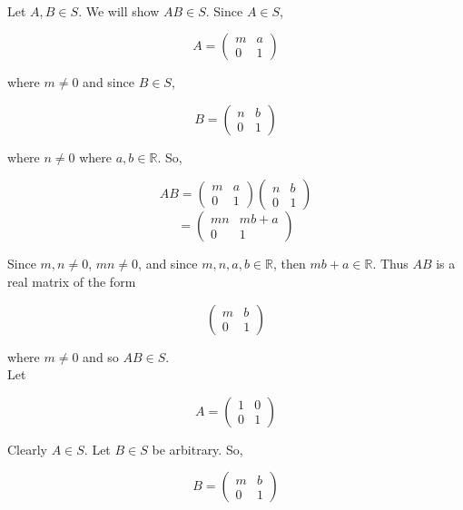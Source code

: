 \begin{solution}\renewcommand{\qedsymbol}{}\ \\
    Let $A, B\in S$. We will show $AB\in S$. Since $A\in S$,
    
    $$A=\left ( \begin{array}{cc} m & a\\ 0 & 1 \end{array} \right )$$
    
    where $m\neq0$ and since $B\in S$,
    
    $$B=\left ( \begin{array}{cc} n & b\\ 0 & 1 \end{array} \right )$$
    
    where $n\neq0$ where $a, b\in\mathbb{R}$. So,
    
    $$AB=\left(\begin{array}{cc} m & a\\ 0 & 1 \end{array}\right)
    \left(\begin{array}{cc} n & b\\ 0 & 1 \end{array}\right)$$
    $$=\left(\begin{array}{cc} mn & mb+a\\ 0 & 1 \end{array}\right)$$
    
    Since $m,n\neq0$, $mn\neq0$, and since $m,n,a,b\in\mathbb{R}$, then $mb+a\in\mathbb{R}$. Thus $AB$
    is a real matrix of the form
    
    $$\left ( \begin{array}{cc} m & b\\ 0 & 1 \end{array} \right )$$
    
    where $m\neq0$ and so $AB\in S$.\\

    Let
    
    $$A=\left ( \begin{array}{cc} 1 & 0\\ 0 & 1 \end{array} \right )$$
    
    Clearly $A\in S$. Let $B\in S$ be arbitrary. So,
    
    $$B=\left ( \begin{array}{cc} m & b\\ 0 & 1 \end{array} \right )$$
    

\end{solution}

